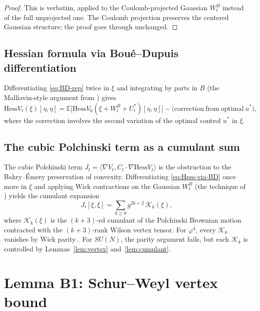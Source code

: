 \documentclass[11pt,a4paper]{amsart}
\theoremstyle{definition}
\newcommand{\Hess}{\mathrm{Hess}}
\begin{document}
\begin{proof}
This is \cite[Lemma~2.5]{BauerschmidtBodineauDagallier2024} verbatim,
applied to the Coulomb-projected Gaussian $W_t^B$ instead of the full
unprojected one. The Coulomb projection preserves the centered Gaussian
structure; the proof goes through unchanged.
\end{proof}

\subsection{Hessian formula via Boué--Dupuis differentiation}

Differentiating \eqref{eq:BD-rep} twice in $\xi$ and integrating by
parts in $B$ (the Malliavin-style argument from
\cite[Proposition~3.9]{BauerschmidtDagallier2024}) gives
\begin{equation}\label{eq:Hess-via-BD}
\Hess V_t(\xi)[\eta, \eta] = \mathbb E\bigl[ \Hess V_0(\xi + W_t^B + U_t^*)[\eta, \eta]\bigr] - \mathrm{(correction\ from\ optimal\ }u^*\mathrm{)},
\end{equation}
where the correction involves the second variation of the optimal
control $u^*$ in $\xi$.

\subsection{The cubic Polchinski term as a cumulant sum}

The cubic Polchinski term $J_t = \langle \nabla V_t, C_t \cdot \nabla
\Hess V_t\rangle$ is the obstruction to the Bakry--Émery preservation
of convexity. Differentiating
\eqref{eq:Hess-via-BD} once more in $\xi$ and applying Wick
contractions on the Gaussian $W_t^B$ (the technique of
\cite[\S 3.2]{BauerschmidtDagallier2024}) yields the cumulant
expansion
\begin{equation}\label{eq:cumulant-expansion}
J_t[\xi, \xi] = \sum_{k \geq 0} g^{2k+2}\, \mathcal K_k(\xi),
\end{equation}
where $\mathcal K_k(\xi)$ is the $(k+3)$-rd cumulant of the Polchinski
Brownian motion contracted with the $(k+3)$-rank Wilson vertex tensor.
For $\varphi^4$, every $\mathcal K_k$ vanishes by Wick parity
\cite[Lemma~3.7]{BauerschmidtDagallier2024}. For $SU(N)$, the parity
argument fails, but each $\mathcal K_k$ is controlled by
Lemmas~\ref{lem:vertex} and~\ref{lem:cumulant}.

\section{Lemma B1: Schur--Weyl vertex bound}\label{sec:vertex}
\end{document}
